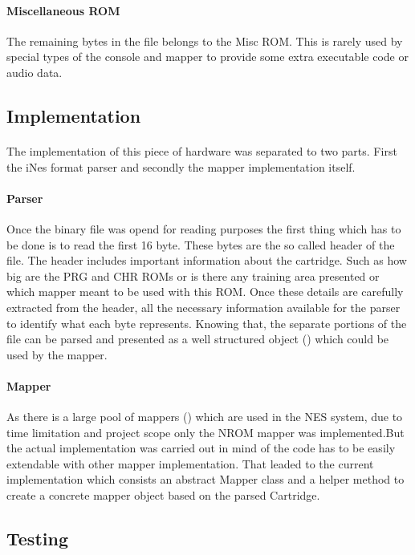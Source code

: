 \documentclass[]{report}
\begin{document}
\paragraph{Miscellaneous ROM}
The remaining bytes in the file belongs to the Misc ROM. This is rarely used by special types of the console and mapper to provide some extra executable code or audio data.

\subsection{Implementation}
\paragraph{ }
The implementation of this piece of hardware was separated to two parts. First the iNes format parser and 
secondly the mapper implementation itself.
\paragraph{Parser}
Once the binary file was opend for reading purposes the first thing which has to be done is to read the first 16 byte. These bytes are the so called header of the file. The header includes important information about the cartridge. Such as how big are the PRG and CHR ROMs or is there any training area presented or which mapper meant to be used with this ROM. Once these details are carefully extracted from the header, all the necessary information available for the parser to identify what each byte represents. Knowing that, the separate portions of the file can be parsed and presented as a well structured object () which could be used by the mapper.
\paragraph{Mapper}
As there is a large pool of mappers (\cite{MPPR}) which are used in the NES system, due to time limitation and project scope only the NROM mapper was implemented.But the actual implementation was carried out in mind of the code has to be easily extendable with other mapper implementation. That leaded to the current implementation which consists an abstract Mapper class and a helper method to create a concrete mapper object based on the parsed Cartridge.

\subsection{Testing}
\end{document}
